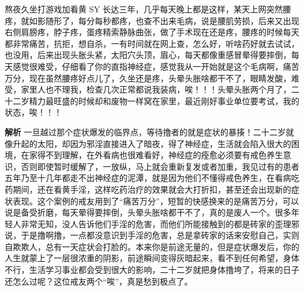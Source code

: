 \begin{case}[神经衰弱]
    熬夜久坐打游戏加看黄 SY 长达三年，几乎每天晚上都是这样，某天上网突然腰疼，就如影随形了，每分每秒都疼，也查不出来毛病，说是腰肌劳损，后来又出现右侧肩膀疼，脖子疼，蛋疼精索静脉曲张，做了手术现在还是疼，腰疼的时候每天都非常痛苦，抗拒，想自杀，一有时间就在网上查，怎么好，听啥药好就去试试，也没用，后来出现头胀头紧，太阳穴头顶，眉心，每天都像重感冒晕得要摔倒，每天感觉很难受，仔细看了你的直指神经症，感觉我从一开始就是这个毛病啊，痛苦万分，现在虽然腰疼好点儿了，久坐还是疼，头晕头胀啥都干不了，眼睛发酸，难受，家里人也不理我，检查几次正常都说我装病，唉！！！头晕头胀两个月了，二十二岁精力最旺盛的时候却和废物一样窝在家里，最近刚好事业单位要考试，我的状态，唉！！！

    \textbf{解析} 一旦越过那个症状爆发的临界点，等待撸者的就是症状的暴揍！二十二岁就像升起的太阳，却因为邪淫直接进入了暗夜，得了神经症，生活就会陷入很大的困境，在家得不到理解，在外看病也很难看好，神经症的痊愈必须要有戒色养生意识，否则即使暂时缓解了，一放纵，马上就会重新复发或者加重，我见过有的患者五年乃至十几年都走不出神经症的泥潭，就是因为他们不懂得戒色养生，在看病吃药期间，还在看黄手淫，这样吃药治疗的效果就会大打折扣，甚至还会出现新的症状表现。这个案例的戒友用到了“痛苦万分”，短暂的快感换来的是痛苦万分，可以说是备受折磨，每天晕得要摔倒，头晕头胀啥都干不了，真的是废人一个。很多年轻人非常无知，没人告诉他们手淫的危害，而他们所能接触到的都是砖家的歪理邪说，于是撸啊撸，一点都没意识到手淫的危害，总是拿砖家的话来安慰自己，实则自欺欺人，总有一天症状会打脸的。本来你是前途无量的，但是症状爆发后，你的人生就蒙上了一层很浓重的阴影，前途瞬间变得灰暗起来，看不到任何希望，身体不行，生活学习事业都会受到很大的影响，二十二岁就把身体撸垮了，将来的日子还怎么过呢？这位戒友两个“唉”，真是愁到极点了。
\end{case}

